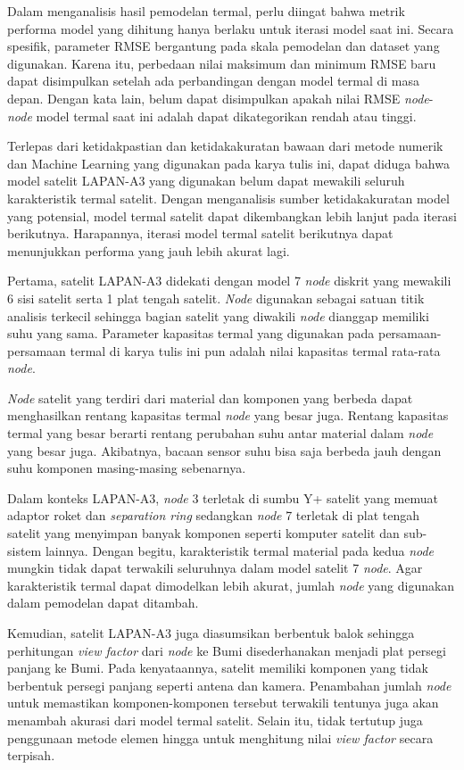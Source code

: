 Dalam menganalisis hasil pemodelan termal, perlu diingat bahwa metrik
performa model yang dihitung hanya berlaku untuk iterasi model saat ini. Secara
spesifik, parameter RMSE bergantung pada skala pemodelan dan dataset yang
digunakan. Karena itu, perbedaan nilai maksimum dan minimum RMSE baru dapat
disimpulkan setelah ada perbandingan dengan model termal di masa depan. Dengan
kata lain, belum dapat disimpulkan apakah nilai RMSE \textit{node}-\textit{node} model termal
saat ini adalah dapat dikategorikan rendah atau tinggi.

Terlepas dari ketidakpastian dan ketidakakuratan bawaan dari metode numerik dan Machine
Learning yang digunakan pada karya tulis ini, dapat diduga bahwa model satelit LAPAN-A3 yang
digunakan belum dapat mewakili seluruh karakteristik termal satelit. Dengan
menganalisis sumber ketidakakuratan model yang potensial, model termal satelit
dapat dikembangkan lebih lanjut pada iterasi berikutnya. Harapannya, iterasi
model termal satelit berikutnya dapat menunjukkan performa yang jauh lebih
akurat lagi.

Pertama, satelit LAPAN-A3 didekati dengan model 7 \textit{node} diskrit yang
mewakili 6 sisi satelit serta 1 plat tengah satelit. \textit{Node} digunakan sebagai
satuan titik analisis terkecil sehingga bagian satelit yang diwakili \textit{node}
dianggap memiliki suhu yang sama. Parameter kapasitas termal yang digunakan
pada persamaan-persamaan termal di karya tulis ini pun adalah nilai kapasitas
termal rata-rata \textit{node}. 

\textit{Node} satelit yang terdiri dari material dan komponen yang berbeda dapat
menghasilkan rentang kapasitas termal \textit{node} yang besar juga. Rentang kapasitas
termal yang besar berarti rentang perubahan suhu antar material dalam \textit{node} yang
besar juga. Akibatnya, bacaan sensor suhu bisa saja berbeda jauh dengan suhu
komponen masing-masing sebenarnya.

Dalam konteks LAPAN-A3, \textit{node} 3 terletak di sumbu Y+ satelit yang memuat adaptor
roket dan \textit{separation ring} sedangkan \textit{node} 7 terletak di plat tengah
satelit yang menyimpan banyak komponen seperti komputer satelit dan sub-sistem
lainnya. Dengan begitu, karakteristik termal material pada kedua \textit{node} mungkin
tidak dapat terwakili seluruhnya dalam model satelit 7 \textit{node}. Agar karakteristik
termal dapat dimodelkan lebih akurat, jumlah \textit{node} yang digunakan dalam
pemodelan dapat ditambah.

Kemudian, satelit LAPAN-A3 juga diasumsikan berbentuk balok sehingga
perhitungan \textit{view factor} dari \textit{node} ke Bumi disederhanakan menjadi plat
persegi panjang ke Bumi. Pada kenyataannya, satelit memiliki komponen yang
tidak berbentuk persegi panjang seperti antena dan kamera. Penambahan jumlah
\textit{node} untuk memastikan komponen-komponen tersebut terwakili tentunya juga akan
menambah akurasi dari model termal satelit. Selain itu, tidak tertutup juga
penggunaan metode elemen hingga untuk menghitung nilai \textit{view factor}
secara terpisah.

